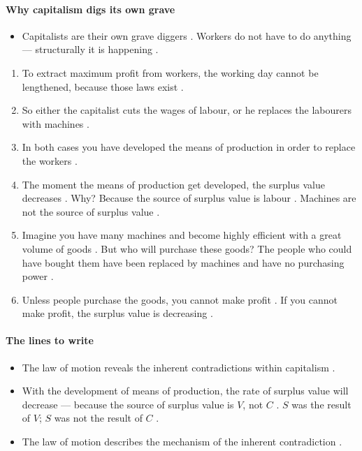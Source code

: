\paragraph{Why capitalism digs its own grave}
\begin{itemize}
    \item Capitalists are their own grave diggers . Workers do not have to do anything --- structurally it is happening .
\end{itemize}
\begin{enumerate}
    \item To extract maximum profit from workers, the working day cannot be lengthened, because those laws exist .
    \item So either the capitalist cuts the wages of labour, or he replaces the labourers with machines .
    \item In both cases you have developed the means of production in order to replace the workers .
    \item The moment the means of production get developed, the surplus value decreases . Why? Because the source of surplus value is labour . Machines are not the source of surplus value .
    \item Imagine you have many machines and become highly efficient with a great volume of goods . But who will purchase these goods? The people who could have bought them have been replaced by machines and have no purchasing power .
    \item Unless people purchase the goods, you cannot make profit . If you cannot make profit, the surplus value is decreasing .
\end{enumerate}

\paragraph{The lines to write}
\begin{itemize}
    \item The law of motion reveals the inherent contradictions within capitalism .
    \item With the development of means of production, the rate of surplus value will decrease --- because the source of surplus value is $V$, not $C$ . $S$ was the result of $V$; $S$ was not the result of $C$ .
    \item The law of motion describes the mechanism of the inherent contradiction .
\end{itemize}

